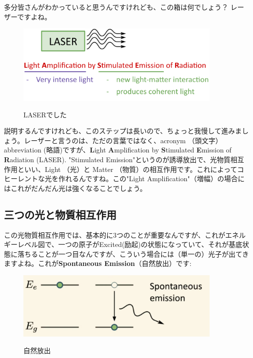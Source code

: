 多分皆さんがわかっていると思うんですけれども、この箱は何でしょう？ レーザーですよね。
\begin{figure}[H]
    \centering
    \includegraphics[width=0.9\textwidth]{lesson5/LASER_box.pdf}
    \label{図: 1}
    \caption{LASERでした}
\end{figure}
説明するんですけれども、このステップは長いので、ちょっと我慢して進みましょう。レーザーと言うのは、ただの言葉ではなく、acronym （頭文字）abbreviation (略語)ですが、\textbf{L}ight \textbf{A}mplification by \textbf{S}timulated \textbf{E}mission of \textbf{R}adiation (LASER).
"Stimulated Emission"というのが誘導放出で、光物質相互作用といい、Light （光）と Matter （物質）の相互作用です。これによってコヒーレントな光を作れるんですね。この"Light Amplification"（増幅）の場合にはこれがだんだん光は強くなることでしょう。
\subsection{三つの光と物質相互作用}

この光物質相互作用では、基本的に3つのことが重要なんですが、これがエネルギーレベル図で、一つの原子がExcited(励起)の状態になっていて、それが基底状態に落ちることが一つ目なんですが、こういう場合には（単一の）光子が出てきますよね。これが\textbf{Spontaneous Emission}（自然放出）です:
\begin{figure}[H]
    \centering
    \includegraphics[width=0.9\textwidth]{lesson5/spontaneous_emission.pdf}
    \label{図: 1}
    \caption{自然放出}
\end{figure}


